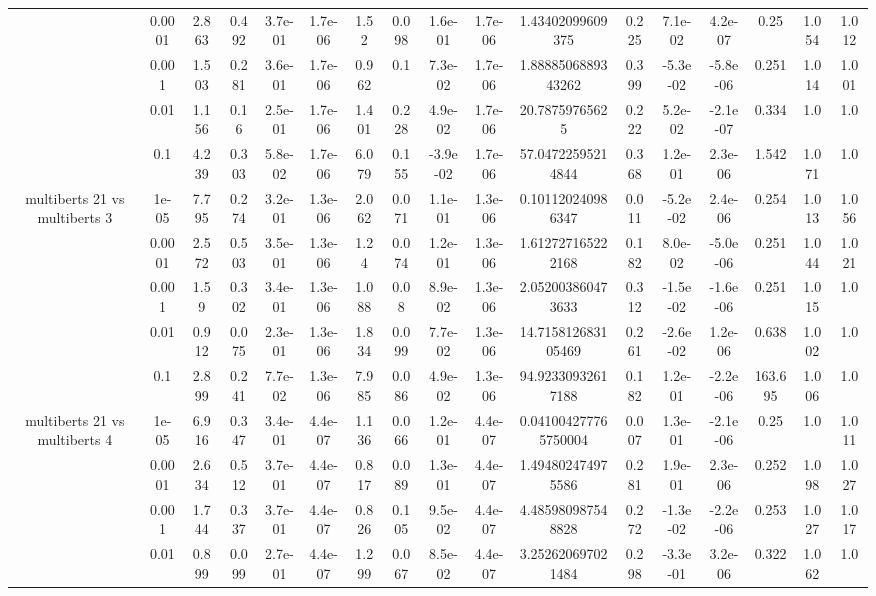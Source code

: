 \begin{tabular}{|c|c|c|c|c|c|c|c|c|c|c|c|c|c|c|c|c|}
 & 0.0001 & 2.863 & 0.492 & 3.7e-01 & 1.7e-06 & 1.52 & 0.098 & 1.6e-01 & 1.7e-06 & 1.43402099609375 & 0.225 & 7.1e-02 & 4.2e-07 & 0.25 & 1.054 & 1.012 \\
 & 0.001 & 1.503 & 0.281 & 3.6e-01 & 1.7e-06 & 0.962 & 0.1 & 7.3e-02 & 1.7e-06 & 1.8888506889343262 & 0.399 & -5.3e-02 & -5.8e-06 & 0.251 & 1.014 & 1.001 \\
 & 0.01 & 1.156 & 0.16 & 2.5e-01 & 1.7e-06 & 1.401 & 0.228 & 4.9e-02 & 1.7e-06 & 20.78759765625 & 0.222 & 5.2e-02 & -2.1e-07 & 0.334 & 1.0 & 1.0 \\
 & 0.1 & 4.239 & 0.303 & 5.8e-02 & 1.7e-06 & 6.079 & 0.155 & -3.9e-02 & 1.7e-06 & 57.04722595214844 & 0.368 & 1.2e-01 & 2.3e-06 & 1.542 & 1.071 & 1.0 \\
\hline
\multirow{5}{*}{multiberts 21 vs multiberts 3} & 1e-05 & 7.795 & 0.274 & 3.2e-01 & 1.3e-06 & 2.062 & 0.071 & 1.1e-01 & 1.3e-06 & 0.101120240986347 & 0.011 & -5.2e-02 & 2.4e-06 & 0.254 & 1.013 & 1.056 \\
 & 0.0001 & 2.572 & 0.503 & 3.5e-01 & 1.3e-06 & 1.24 & 0.074 & 1.2e-01 & 1.3e-06 & 1.612727165222168 & 0.182 & 8.0e-02 & -5.0e-06 & 0.251 & 1.044 & 1.021 \\
 & 0.001 & 1.59 & 0.302 & 3.4e-01 & 1.3e-06 & 1.088 & 0.08 & 8.9e-02 & 1.3e-06 & 2.052003860473633 & 0.312 & -1.5e-02 & -1.6e-06 & 0.251 & 1.015 & 1.0 \\
 & 0.01 & 0.912 & 0.075 & 2.3e-01 & 1.3e-06 & 1.834 & 0.099 & 7.7e-02 & 1.3e-06 & 14.715812683105469 & 0.261 & -2.6e-02 & 1.2e-06 & 0.638 & 1.002 & 1.0 \\
 & 0.1 & 2.899 & 0.241 & 7.7e-02 & 1.3e-06 & 7.985 & 0.086 & 4.9e-02 & 1.3e-06 & 94.92330932617188 & 0.182 & 1.2e-01 & -2.2e-06 & 163.695 & 1.006 & 1.0 \\
\hline
\multirow{5}{*}{multiberts 21 vs multiberts 4} & 1e-05 & 6.916 & 0.347 & 3.4e-01 & 4.4e-07 & 1.136 & 0.066 & 1.2e-01 & 4.4e-07 & 0.041004277765750004 & 0.007 & 1.3e-01 & -2.1e-06 & 0.25 & 1.0 & 1.011 \\
 & 0.0001 & 2.634 & 0.512 & 3.7e-01 & 4.4e-07 & 0.817 & 0.089 & 1.3e-01 & 4.4e-07 & 1.494802474975586 & 0.281 & 1.9e-01 & 2.3e-06 & 0.252 & 1.098 & 1.027 \\
 & 0.001 & 1.744 & 0.337 & 3.7e-01 & 4.4e-07 & 0.826 & 0.105 & 9.5e-02 & 4.4e-07 & 4.485980987548828 & 0.272 & -1.3e-02 & -2.2e-06 & 0.253 & 1.027 & 1.017 \\
 & 0.01 & 0.899 & 0.099 & 2.7e-01 & 4.4e-07 & 1.299 & 0.067 & 8.5e-02 & 4.4e-07 & 3.252620697021484 & 0.298 & -3.3e-01 & 3.2e-06 & 0.322 & 1.062 & 1.0 \\

\end{tabular}
